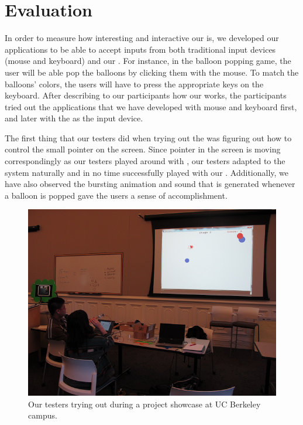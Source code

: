 \section{Evaluation}\label{sec:eval}

In order to measure how interesting and interactive our \tube is, we developed our applications to be able to accept inputs from both traditional input devices (\ie mouse and keyboard) and our \tube. For instance, in the balloon popping game, the user will be able pop the balloons by clicking them with the mouse. To match the balloons’ colors, the users will have to press the appropriate keys on the keyboard. After describing to our participants how our \tube works, the participants tried out the applications that we have developed with mouse and keyboard first, and later with the \tube as the input device.

The first thing that our testers did when trying out the \tube was figuring out how to control the small pointer on the screen. Since pointer in the screen is moving correspondingly as our testers played around with \tube, our testers adapted to the system naturally and in no time successfully played with our \tube. Additionally, we have also observed the bursting animation and sound that is generated whenever a balloon is popped gave the users a sense of accomplishment.

\begin{figure}
  \centering
  \includegraphics[width=\linewidth]{./figs/impl2.png}
  \caption{Our testers trying out \tube during a project showcase at UC Berkeley campus.}
  \label{fig:impl2}
\end{figure}

